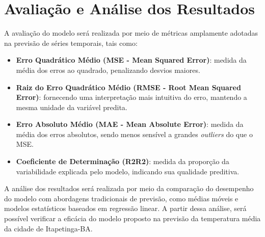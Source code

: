 \section{Avaliação e Análise dos Resultados}

    A avaliação do modelo será realizada por meio de métricas amplamente adotadas na previsão de 
    séries temporais, tais como: 
    \begin{itemize} 
        \item \textbf{Erro Quadrático Médio (MSE - Mean Squared Error)}: medida da média dos erros ao quadrado, 
        penalizando desvios maiores.
        \item \textbf{Raiz do Erro Quadrático Médio (RMSE - Root Mean Squared Error)}: fornecendo uma 
        interpretação mais intuitiva do erro, mantendo a mesma unidade da variável predita. 
        \item \textbf{Erro Absoluto Médio (MAE - Mean Absolute Error)}: medida da média dos erros absolutos, 
        sendo menos sensível a grandes \emph{outliers} do que o MSE. 
        \item \textbf{Coeficiente de Determinação (R2R2)}: medida da proporção da variabilidade explicada 
        pelo modelo, indicando sua qualidade preditiva. \end{itemize}

    A análise dos resultados será realizada por meio da comparação do desempenho do modelo com abordagens 
    tradicionais de previsão, como médias móveis e modelos estatísticos baseados em regressão linear. 
    A partir dessa análise, será possível verificar a eficácia do modelo proposto na previsão da 
    temperatura média da cidade de Itapetinga-BA.
